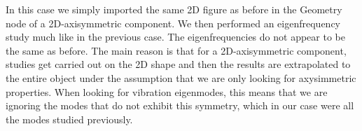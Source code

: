 \documentclass[a4paper]{article}
\begin{document}
In this case we simply imported the same 2D figure as before in the Geometry node of a 2D-axisymmetric component. We then performed an eigenfrequency study much like in the previous case. The eigenfrequencies do not appear to be the same as before. The main reason is that for a 2D-axisymmetric component, studies get carried out on the 2D shape and then the results are extrapolated to the entire object under the assumption that we are only looking for axysimmetric properties. When looking for vibration eigenmodes, this means that we are ignoring the modes that do not exhibit this symmetry, which in our case were all the modes studied previously.
\end{document}
